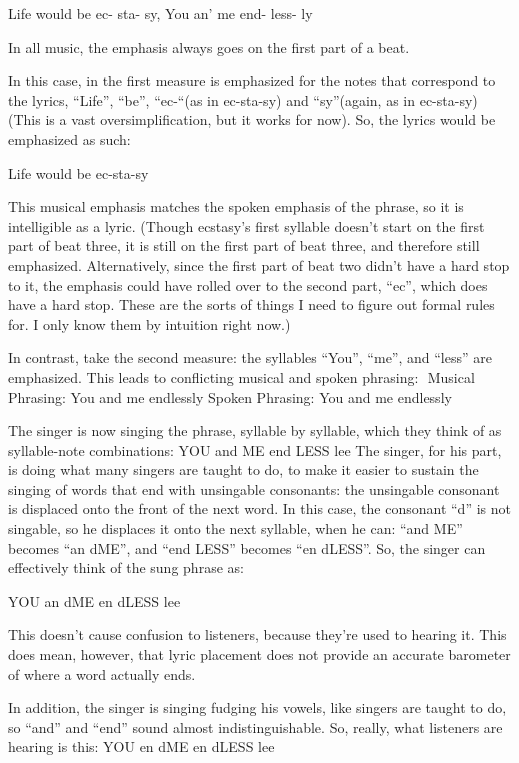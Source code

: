 \documentclass[10pt,oneside]{memoir}
\begin{document}
Life   would be  ec-            sta-    sy,        You  an'  me   end-  less- ly 


In all music, the emphasis always goes on the first part of a beat.  


In this case, in the first measure is emphasized for the notes that correspond to the lyrics, ``Life'', ``be'', ``ec-``(as in ec-sta-sy)  and ``sy''(again, as in ec-sta-sy) (This is a vast oversimplification, but it works for now). So, the lyrics would be emphasized as such:


Life would be ec-sta-sy


This musical emphasis matches the spoken emphasis of the phrase, so it is intelligible as a lyric.  (Though ecstasy's first syllable doesn't start on the first part of beat three, it is still on the first part of beat three, and therefore still emphasized.  Alternatively, since the first part of beat two didn't have a hard stop to it, the emphasis could have rolled over to the second part,  ``ec'', which does have a hard stop. These are the sorts of things I need to figure out formal rules for.  I only know them by intuition right now.)


In contrast, take the second measure:  the syllables ``You'', ``me'', and ``less'' are emphasized.  This leads to conflicting musical and spoken phrasing: 
Musical Phrasing:   You and me  endlessly
Spoken Phrasing:    You and me  endlessly


The singer is now singing the phrase, syllable by syllable, which they think of as syllable-note combinations:
YOU and ME end LESS lee
The singer, for his part, is doing what many singers are taught to do, to make it easier to sustain the singing of words that end with unsingable consonants: the unsingable consonant is displaced onto the front of the next word.  In this case, the consonant ``d'' is not singable, so he displaces it onto the next syllable, when he can:  ``and ME'' becomes ``an   dME'', and ``end LESS''  becomes ``en  dLESS''.  So, the singer can effectively think of the sung phrase as:


YOU an  dME en dLESS lee


This doesn't cause confusion to listeners, because they're used to hearing it.  This does mean, however, that lyric placement does not provide an accurate barometer of where a word actually ends.   


In addition, the singer is singing fudging his vowels, like singers are taught to do,   so ``and'' and ``end'' sound almost indistinguishable.  So, really, what listeners are hearing is this:
  YOU en dME en dLESS lee
\end{document}
